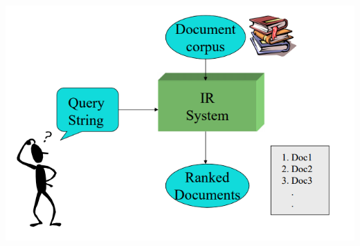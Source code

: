 \documentclass{report}
\begin{document}
	\begin{center}
		\includegraphics[scale=0.6]{assets/irsystem.png}
	\end{center}
\end{document}

